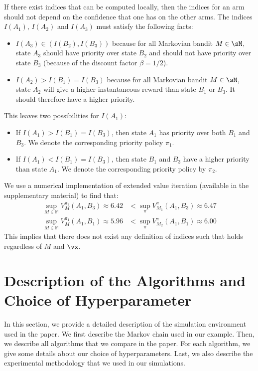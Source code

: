 If there exist indices that can be computed locally, then the indices for an arm should not depend on the confidence that one has on the other arms. The indices $I(A_1)$, $I(A_2)$ and $I(A_3)$ must satisfy the following facts: 
\begin{itemize}
    \item $I(A_3)\in(I(B_2),I(B_3))$ because for all Markovian bandit $M\in\sM$, state $A_3$ should have priority over state $B_2$ and should not have priority over state $B_3$ (because of the discount factor $\beta=1/2$).
    \item $I(A_2)>I(B_1)=I(B_3)$ because for all Markovian bandit $M\in\sM$, state $A_2$ will give a higher instantaneous reward than state $B_1$ or $B_3$. It should therefore have a higher priority.
\end{itemize}
This leaves two possibilities for $I(A_1)$: 
\begin{itemize}
\item If $I(A_1)>I(B_1)=I(B_3)$, then state $A_1$ has priority over both $B_1$ and $B_3$.  We denote the corresponding priority policy $\pi_1$.
\item If $I(A_1)<I(B_1)=I(B_3)$, then state $B_1$ and $B_3$ have a higher priority than state $A_1$. We denote the corresponding priority policy by $\pi_2$.
\end{itemize}  

We use a numerical implementation of extended value iteration (available in the supplementary material) to find that:
\begin{align}
    \sup_{M\in\mathbb{M}} V^{\pi_2}_{M}(A_1,B_3) \approx 6.42
    &< \sup_{\pi}V^{\pi}_{M_1}(A_1,B_3) \approx 6.47 \label{eq:counter-example1}\\
    \sup_{M\in\mathbb{M}} V^{\pi_1}_{M}(A_1,B_1) \approx 5.96
    &< \sup_{\pi}V^{\pi}_{M_2}(A_1,B_1) \approx 6.00 \nonumber
\end{align}
This implies that there does not exist any definition of indices such that  holds regardless of $M$ and $\vx$. 

\section{Description of the Algorithms and Choice of Hyperparameter}
\label{apx:algos}

In this section, we provide a detailed description of the simulation environment used in the paper. We first describe the Markov chain used in our example. Then, we describe all algorithms that we compare in the paper. For each algorithm, we give some details about our choice of hyperparameters. Last, we also describe the experimental methodology that we used in our simulations. 

